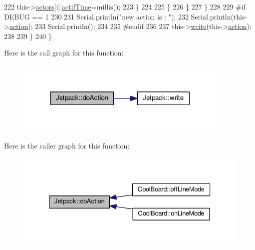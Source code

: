 \begin{DoxyCode}
222                         this->\hyperlink{classJetpack_a7e16d2f97837f9712a2e6de1c50d99db}{actors}[i].\hyperlink{structJetpack_1_1state_af2e1cc323ef9ffcc3cf4d203f85d726b}{actifTime}=millis();              
223                     \}           
224             
225                 \}
226             \}
227         \}
228     
229 \textcolor{preprocessor}{    #if DEBUG == 1 }
230 
231         Serial.println(\textcolor{stringliteral}{"new action is : "});
232         Serial.println(this->\hyperlink{classJetpack_aca3142925a7b0834b34ae91d26af7765}{action});
233         Serial.println();
234     
235 \textcolor{preprocessor}{    #endif }
236 
237         this->\hyperlink{classJetpack_a338f1af8cbc6504ac69b47c7328569b5}{write}(this->\hyperlink{classJetpack_aca3142925a7b0834b34ae91d26af7765}{action});
238 
239     \} 
240 \}
\end{DoxyCode}
Here is the call graph for this function\+:\nopagebreak
\begin{figure}[H]
\begin{center}
\leavevmode
\includegraphics[width=289pt]{classJetpack_a86d2e83436ef4b85f4c3a6e85ac785b0_cgraph}
\end{center}
\end{figure}
Here is the caller graph for this function\+:\nopagebreak
\begin{figure}[H]
\begin{center}
\leavevmode
\includegraphics[width=333pt]{classJetpack_a86d2e83436ef4b85f4c3a6e85ac785b0_icgraph}
\end{center}
\end{figure}
\mbox{\label{classJetpack_ac54a7bb4f9166bee32052253d9b1d306}} 
